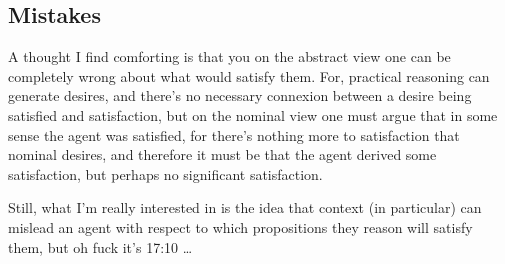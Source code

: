\documentclass[10pt]{article}
\begin{document}
\subsection{Mistakes}
\label{sec:mistakes}

A thought I find comforting is that you on the abstract view one can be completely wrong about what would satisfy them.
For, practical reasoning can generate desires, and there's no necessary connexion between a desire being satisfied and satisfaction, but on the nominal view one must argue that in some sense the agent was satisfied, for there's nothing more to satisfaction that nominal desires, and therefore it must be that the agent derived some satisfaction, but perhaps no significant satisfaction.

Still, what I'm really interested in is the idea that context (in particular) can mislead an agent with respect to which propositions they reason will satisfy them, but oh fuck it's 17:10 \dots


\newpage
\printbibliography
\end{document}
